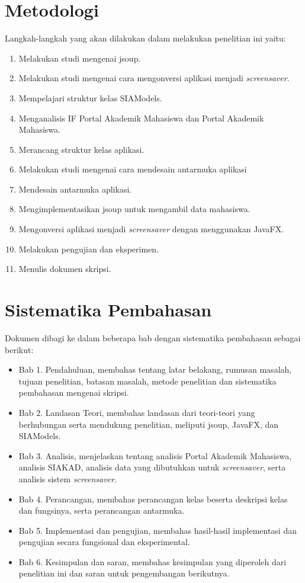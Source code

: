 \section{Metodologi}
\label{sec:metlit}
Langkah-langkah yang akan dilakukan dalam melakukan penelitian ini yaitu:
	\begin{enumerate}
		\item Melakukan studi mengenai jsoup.
		\item Melakukan studi mengenai cara mengonversi aplikasi menjadi \textit{screensaver}.
		\item Mempelajari struktur kelas SIAModels.
		\item Menganalisis IF Portal Akademik Mahasiswa dan Portal Akademik Mahasiswa.
		\item Merancang struktur kelas aplikasi.
		\item Melakukan studi mengenai cara mendesain antarmuka aplikasi
	    \item Mendesain antarmuka aplikasi.
	    \item Mengimplementasikan jsoup untuk mengambil data mahasiswa.
        \item Mengonversi aplikasi menjadi \textit{screensaver} dengan menggunakan JavaFX. 
		\item Melakukan pengujian dan eksperimen.
		\item Menulis dokumen skripsi.
	\end{enumerate}

\section{Sistematika Pembahasan}
\label{sec:sispem}
Dokumen dibagi ke dalam beberapa bab dengan sistematika pembahasan sebagai berikut:
    \begin{itemize}
        \item Bab 1. Pendahuluan, membahas tentang latar belakang, rumusan masalah, tujuan penelitian, batasan masalah, metode penelitian dan sistematika pembahasan mengenai skripsi.
        \item Bab 2. Landasan Teori, membahas landasan dari teori-teori yang berhubungan serta mendukung penelitian, meliputi jsoup, JavaFX, dan SIAModels. 
        \item Bab 3. Analisis, menjelaskan tentang analisis Portal Akademik Mahasiswa, analisis SIAKAD, analisis data yang dibutuhkan untuk \textit{screensaver}, serta analisis sistem \textit{screensaver}.
        \item Bab 4. Perancangan, membahas perancangan kelas beserta deskripsi kelas dan fungsinya, serta perancangan antarmuka.
        \item Bab 5. Implementasi dan pengujian, membahas hasil-hasil implementasi dan pengujian secara fungsional dan eksperimental.
        \item Bab 6. Kesimpulan dan saran, membahas kesimpulan yang diperoleh dari penelitian ini dan saran untuk pengembangan berikutnya.
    \end{itemize}